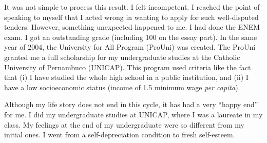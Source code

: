 It was not simple to process this result. I felt incompetent. I reached the point of speaking to myself that I acted wrong in wanting to apply for such well-disputed tenders. However, something unexpected happened to me. I had done the ENEM exam. I got an outstanding grade (including 100 on the essay part). In the same year of 2004, the University for All Program (ProUni) was created. The ProUni granted me a full scholarship for my undergraduate studies at the Catholic University of Pernambuco (UNICAP). This program used criteria like the fact that (i) I have studied the whole high school in a public institution, and (ii) I have a low socioeconomic status (income of 1.5 minimum wage \textit{per capita}).

Although my life story does not end in this cycle, it has had a very “happy end” for me. I did my undergraduate studies at UNICAP, where I was a laureate in my class. My feelings at the end of my undergraduate were so different from my initial ones. I went from a self-depreciation condition to fresh self-esteem.


                

        
                
